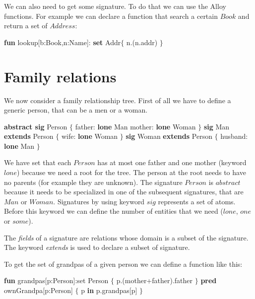 \documentclass[12pt, a4paper]{report}
\newtheorem[style=M,bodystyle=\normalfont]{theorem}{Theorem}
\newtheorem[style=M,bodystyle=\normalfont]{corollary}{Corollary}
\newtheorem[style=M,bodystyle=\normalfont]{lemma}{Lemma}
\newtheorem[style=M,bodystyle=\normalfont]{definition}{Definition}
\begin{document}
    We can also need to get some signature. To do that we can use the Alloy functions. For example we can declare a function that search a certain $Book$ and return a set of $Address$:
    \begin{algorithmic}[H]
        \State \textbf{fun} lookup[b:Book,n:Name]: \textbf{set} Addr$\{$
        \State \:\:\:\:\:\:\:\: n.(n.addr)
        \State $\}$
    \end{algorithmic} 

    \section{Family relations}
    We now consider a family relationship tree. First of all we have to define a generic person, that can be a men or a woman.
    \begin{algorithmic}[H]
        \State \textbf{abstract sig} Person $\{$
        \State \:\:\:\:\:\:\:\: father: \textbf{lone} Man 
        \State \:\:\:\:\:\:\:\: mother: \textbf{lone} Woman
        \State $\}$
        \State \textbf{sig} Man \textbf{extends} Person $\{$
        \State \:\:\:\:\:\:\:\: wife: \textbf{lone} Woman 
        \State $\}$
        \State \textbf{sig} Woman \textbf{extends} Person $\{$
        \State \:\:\:\:\:\:\:\: husband: \textbf{lone} Man 
        \State $\}$
    \end{algorithmic} 
    We have set that each $Person$ has at most one father and one mother (keyword $lone$) because we need a root for the tree. The person at the root needs to have no parents 
    (for example they are unknown). The signature $Person$ is $abstract$ because it needs to be specialized in one of the subsequent signatures, that are $Man$ or $Woman$.
    Signatures by using keyword $sig$ represents a set of atoms. Before this keyword we can define the number of entities that we need ($lone$, $one$ or $some$).
    \begin{definition}
        The \emph{fields} of a signature are relations whose domain is a subset of the signature. The keyword \emph{extends} is used to declare a subset of signature. 
    \end{definition}
    To get the set of grandpas of a given person we can define a function like this: 
    \begin{algorithmic}[H]
        \State \textbf{fun} grandpas[p:Person]:set Person $\{$
        \State \:\:\:\:\:\:\:\: p.(mother+father).father
        \State $\}$
        \State \textbf{pred} ownGrandpa[p:Person] $\{$
        \State \:\:\:\:\:\:\:\: p \textbf{in} p.grandpas[p]
        \State $\}$
    \end{algorithmic} 
\end{document}
